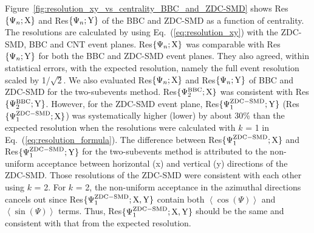 \documentclass[aps,prc,superscriptaddress,showpacs,floatfix,twocolumn]{revtex4}
\begin{document}
Figure~\ref{fig:resolution_xy_vs_centrality_BBC_and_ZDC-SMD} shows 
Res$\{\Psi_n;{\rm X}\}$ and Res$\{\Psi_n;{\rm Y}\}$ of the BBC and ZDC-SMD 
as a function of centrality. The resolutions are calculated by using 
Eq.~(\ref{eq:resolution_xy}) with the ZDC-SMD, BBC and CNT event planes. 
Res$\{\Psi_n;{\rm X}\}$ was comparable with Res$\{\Psi_n;{\rm Y}\}$ for 
both the BBC and ZDC-SMD event planes. They also agreed, within statistical 
errors, with the expected resolution, namely the full event resolution 
scaled by 1/$\sqrt{2}$. We also evaluated Res$\{\Psi_n;{\rm X}\}$ and 
Res$\{\Psi_n;{\rm Y}\}$ of BBC and ZDC-SMD for the two-subevents method. 
Res$\{\Psi_2^{\rm BBC};{\rm X}\}$ was consistent with Res$\{\Psi_2^{\rm 
BBC};{\rm Y}\}$. However, for the ZDC-SMD event plane, Res$\{\Psi_1^{\rm 
ZDC-SMD};{\rm Y}\}$ (Res$\{\Psi_1^{\rm ZDC-SMD};{\rm X}\}$) was 
systematically higher (lower) by about 30\% than the expected resolution 
when the resolutions were calculated with $k$ = 1 in 
Eq.~(\ref{eq:resolution_formula}). The difference between Res$\{\Psi_1^{\rm 
ZDC-SMD};{\rm X}\}$ and Res$\{\Psi_1^{\rm ZDC-SMD};{\rm Y}\}$ for the 
two-subevents method is attributed to the non-uniform acceptance between 
horizontal (x) and vertical (y) directions of the ZDC-SMD. Those 
resolutions of the ZDC-SMD were consistent with each other using $k$ = 2. 
For $k$ = 2, the non-uniform acceptance in the azimuthal directions cancels 
out since Res$\{\Psi_1^{\rm ZDC-SMD};{\rm X,Y}\}$ contain both 
$\left<\cos{(\Psi)}\right>$ and $\left<\sin{(\Psi)}\right>$ terms. Thus, 
Res$\{\Psi_1^{\rm ZDC-SMD};{\rm X,Y}\}$ should be the same and consistent 
with that from the expected resolution.
\end{document}
